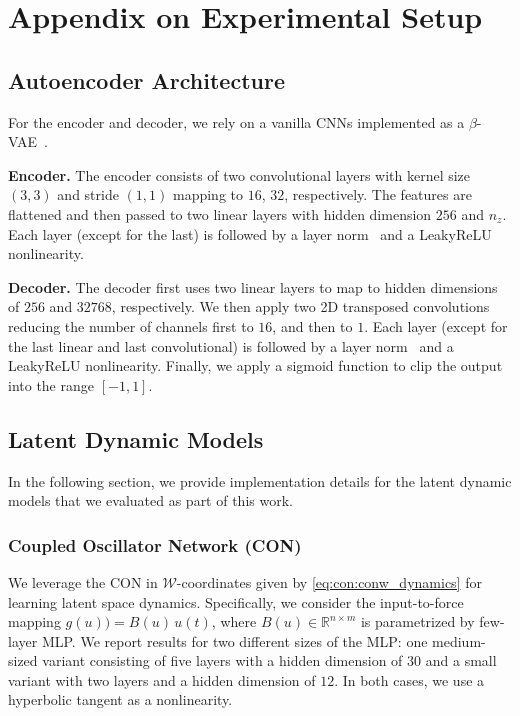 \section{Appendix on Experimental Setup}\label{sec:apx-con:experimental_setup}

\subsection{Autoencoder Architecture}
For the encoder and decoder, we rely on a vanilla \glspl{CNN} implemented as a $\beta$-\gls{VAE}~\citep{kingma2014auto}.

\textbf{Encoder.} The encoder consists of two convolutional layers with kernel size $(3, 3)$ and stride $(1, 1)$ mapping to $16$, $32$, respectively.
The features are flattened and then passed to two linear layers with hidden dimension $256$ and $n_z$.
Each layer (except for the last) is followed by a layer norm~\citep{ba2016layer} and a LeakyReLU nonlinearity.

\textbf{Decoder.} The decoder first uses two linear layers to map to hidden dimensions of $256$ and $32768$, respectively.
We then apply two 2D transposed convolutions~\citep{dumoulin2016guide} reducing the number of channels first to $16$, and then to $1$.
Each layer (except for the last linear and last convolutional) is followed by a layer norm~\citep{ba2016layer} and a LeakyReLU nonlinearity.
Finally, we apply a sigmoid function to clip the output into the range $[-1, 1]$.

\subsection{Latent Dynamic Models}\label{sub:apx-con:latent_dynamic_models}
In the following section, we provide implementation details for the latent dynamic models that we evaluated as part of this work.

\subsubsection{Coupled Oscillator Network (CON)}\label{ssub:apx-con:latent_space_dynamic_models:con}
We leverage the \gls{CON} in $\mathcal{W}$-coordinates given by \eqref{eq:con:conw_dynamics} for learning latent space dynamics. 
Specifically, we consider the input-to-force mapping $g(u)) = B(u) \, u(t)$, where $B(u) \in \mathbb{R}^{n \times m}$ is parametrized by few-layer \gls{MLP}. We report results for two different sizes of the \gls{MLP}: one medium-sized variant consisting of five layers with a hidden dimension of $30$ and a small variant with two layers and a hidden dimension of $12$. In both cases, we use a hyperbolic tangent as a nonlinearity.


